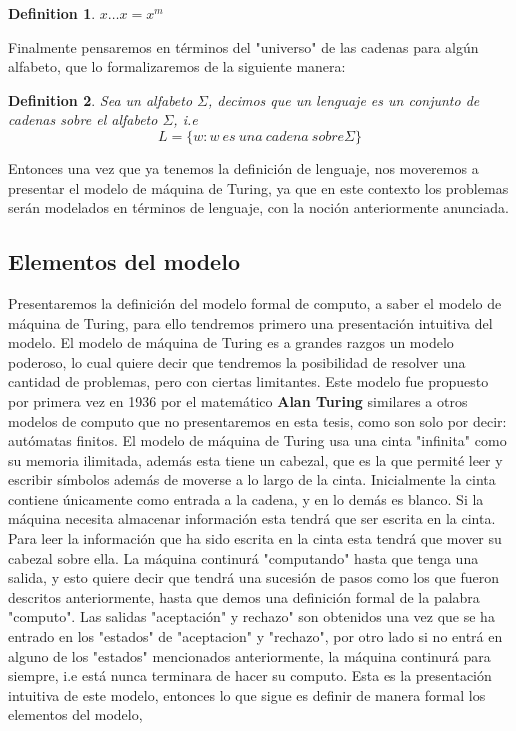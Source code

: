 \documentclass[10pt]{report}
\newtheorem{definition}{Definition}
\begin{document}
{\begin{definition}
        $x\dots x = x^m$
    \end{definition}
    Finalmente pensaremos en términos del "universo" de las cadenas para algún alfabeto, que lo formalizaremos de la
    siguiente manera:
    \begin{definition}
        Sea un alfabeto $\Sigma$, decimos que un lenguaje es un conjunto de cadenas sobre el alfabeto $\Sigma$, i.e
        \begin{equation}
            \label{eq:equation7}
             L = \{w : w\ es \ una \ cadena\ sobre \Sigma \}
        \end{equation}
    \end{definition}
    Entonces una vez que ya tenemos la definición de lenguaje, nos moveremos a presentar el modelo de máquina de Turing,
    ya que en este contexto los problemas serán modelados en términos de lenguaje, con la noción anteriormente anunciada.


    \subsection{Elementos del modelo}\label{subsec:elementos-del-modelo-de-máquina-de-turing}
    Presentaremos la definición del modelo formal de computo, a saber el modelo de máquina de Turing,
    para ello tendremos primero una presentación intuitiva del modelo.\newline
    El modelo de máquina de Turing es a grandes razgos un modelo poderoso, lo cual quiere decir que tendremos la posibilidad
    de resolver una cantidad de problemas, pero con ciertas limitantes.\newline
    \space
    Este modelo fue propuesto por primera vez en 1936 por el matemático \textbf{Alan Turing} similares a
    otros modelos de computo que no presentaremos en esta tesis, como son solo por decir: autómatas finitos.
    El modelo de máquina de Turing usa una cinta "infinita" como su memoria ilimitada,
    además esta tiene un cabezal, que es la que permité leer y escribir símbolos además de moverse
    a lo largo de la cinta.\space
    Inicialmente la cinta contiene únicamente como entrada a la cadena, y en lo demás es blanco.\space
    Si la máquina necesita almacenar información esta tendrá que ser escrita en la cinta.\space
    Para leer la información que ha sido escrita en la cinta esta tendrá que mover su cabezal sobre ella.\space
    La máquina continurá "computando" hasta que tenga una salida, y esto quiere decir que tendrá una sucesión de pasos
    como los que fueron descritos anteriormente, hasta que demos una definición formal de la palabra "computo".
    Las salidas "aceptación" y rechazo" son obtenidos una vez que se ha entrado en los "estados" de "aceptacion" y  "rechazo",
    por otro lado si no entrá en alguno de los "estados" mencionados anteriormente, la máquina continurá para siempre, i.e
    está nunca terminara de hacer su computo.\space
    Esta es la presentación intuitiva de este modelo, entonces lo que sigue es definir de manera formal los elementos del modelo,


}
\end{document}
